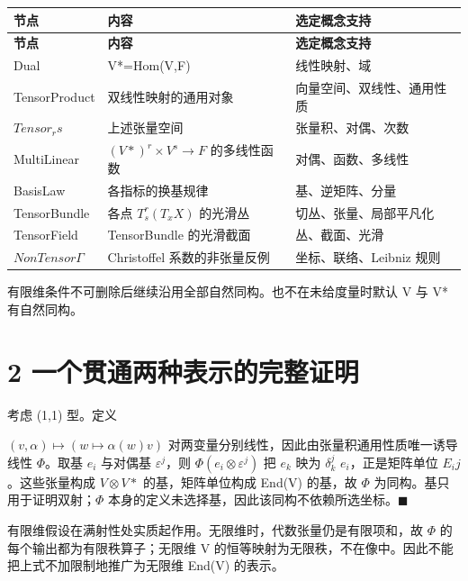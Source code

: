 \documentclass[UTF8,a4paper,zihao=-4,fontset=windows,openany]{ctexbook}
\newcommand{\mcsdisplay}[1]{%
  \par\addvspace{0.7em}%
  \sbox{\mcsmathbox}{\ensuremath{\displaystyle #1}}%
  \ifdim\wd\mcsmathbox>\linewidth
    \noindent\resizebox{\linewidth}{!}{\usebox{\mcsmathbox}}%
  \else
    \noindent\hspace*{\fill}\usebox{\mcsmathbox}\hspace*{\fill}%
  \fi
  \par\addvspace{0.7em}%
}
\def\ensuremath#1{#1}%
\def\mathrm#1{#1}%
\begin{document}
\begingroup\small\setlength{\tabcolsep}{4pt}
\begin{longtable}{>{\raggedright\arraybackslash}p{}>{\raggedright\arraybackslash}p{}>{\raggedright\arraybackslash}p{}}
\toprule
\textbf{节点} & \textbf{内容} & \textbf{选定概念支持} \\
\midrule
\endfirsthead
\toprule
\textbf{节点} & \textbf{内容} & \textbf{选定概念支持} \\
\midrule
\endhead
\bottomrule
\endfoot
\bottomrule
\endlastfoot
Dual & V*=Hom(V,F) & 线性映射、域 \\
TensorProduct & 双线性映射的通用对象 & 向量空间、双线性、通用性质 \\
\(\mathrm{Tensor}_\mathrm{rs}\) & 上述张量空间 & 张量积、对偶、次数 \\
MultiLinear & \((V*)^r\times V^s\to F\) 的多线性函数 & 对偶、函数、多线性 \\
BasisLaw & 各指标的换基规律 & 基、逆矩阵、分量 \\
TensorBundle & 各点 \(T^r_s(T_\mathrm{xX})\) 的光滑丛 & 切丛、张量、局部平凡化 \\
TensorField & TensorBundle 的光滑截面 & 丛、截面、光滑 \\
\(\mathrm{NonTensor}\Gamma\) & Christoffel 系数的非张量反例 & 坐标、联络、Leibniz 规则 \\
\end{longtable}
\endgroup

有限维条件不可删除后继续沿用全部自然同构。也不在未给度量时默认 V 与 V* 有自然同构。

\section{2 一个贯通两种表示的完整证明}
考虑 (1,1) 型。定义


\mcsdisplay{\Phi:V\otimes V^*\longrightarrow End(V),\qquad
\Phi(v\otimes\alpha)(w)=\alpha(w)v.}
\noindent \((v,\alpha)\mapsto(w\mapsto\alpha(w)v)\) 对两变量分别线性，因此由张量积通用性质唯一诱导线性 \(\Phi\)。取基 \(e_i\) 与对偶基 \(\varepsilon^j\)，则 \(\Phi(e_i\otimes\varepsilon^j)\) 把 \(e_k\) 映为 \(\delta^j_k\) \(e_i\)，正是矩阵单位 \(E_\mathrm{ij}\)。这些张量构成 \(V\otimes V*\) 的基，矩阵单位构成 End(V) 的基，故 \(\Phi\) 为同构。基只用于证明双射；\(\Phi\) 本身的定义未选择基，因此该同构不依赖所选坐标。\(\blacksquare\)

有限维假设在满射性处实质起作用。无限维时，代数张量仍是有限项和，故 \(\Phi\) 的每个输出都为有限秩算子；无限维 V 的恒等映射为无限秩，不在像中。因此不能把上式不加限制地推广为无限维 End(V) 的表示。
\end{document}
